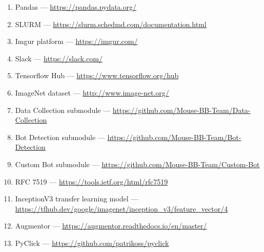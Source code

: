 \begin{enumerate}
    \item Pandas --- \url{https://pandas.pydata.org/}\label{itm:pandas}
    \item SLURM --- \url{https://slurm.schedmd.com/documentation.html}\label{itm:slurm}
    \item Imgur platform --- \url{https://imgur.com/}\label{itm:imgur}
    \item Slack --- \url{https://slack.com/}\label{itm:slack}
    \item Tensorflow Hub --- \url{https://www.tensorflow.org/hub}\label{itm:tensorflow-hub}
    \item ImageNet dataset --- \url{http://www.image-net.org/}\label{itm:image-net}
    \item Data Collection submodule --- \url{https://github.com/Mouse-BB-Team/Data-Collection}\label{itm:data-collection}
    \item Bot Detection submodule --- \url{https://github.com/Mouse-BB-Team/Bot-Detection}\label{itm:bot-detection}
    \item Custom Bot submodule --- \url{https://github.com/Mouse-BB-Team/Custom-Bot}\label{itm:custom-bot}
    \item RFC 7519 --- \url{https://tools.ietf.org/html/rfc7519}\label{itm:rfc-jwt}
    \item InceptionV3 transfer learning model --- \url{https://tfhub.dev/google/imagenet/inception_v3/feature_vector/4}\label{itm:inceptionV3}
    \item Augmentor --- \url{https://augmentor.readthedocs.io/en/master/}\label{itm:augmentor}
    \item PyClick --- \url{https://github.com/patrikoss/pyclick}\label{itm:pyclick}
\end{enumerate}
\newpage
\thispagestyle{appendix}